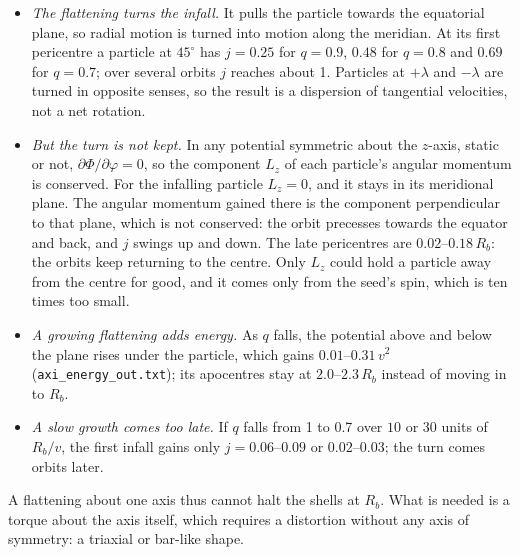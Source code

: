 \documentclass[11pt,a4paper]{article}
\begin{document}
\begin{itemize}
\item \emph{The flattening turns the infall.} It pulls the particle towards the
  equatorial plane, so radial motion is turned into motion along the meridian. At
  its first pericentre a particle at $45^\circ$ has $j=0.25$ for $q=0.9$, $0.48$ for
  $q=0.8$ and $0.69$ for $q=0.7$; over several orbits $j$ reaches about 1. Particles
  at $+\lambda$ and $-\lambda$ are turned in opposite senses, so the result is a
  dispersion of tangential velocities, not a net rotation.
\item \emph{But the turn is not kept.} In any potential symmetric about the
  $z$-axis, static or not, $\partial\Phi/\partial\varphi=0$, so the component $L_z$
  of each particle's angular momentum is conserved. For the infalling particle
  $L_z=0$, and it stays in its meridional plane. The angular momentum gained there is
  the component perpendicular to that plane, which is not conserved: the orbit
  precesses towards the equator and back, and $j$ swings up and down. The late
  pericentres are $0.02$--$0.18\,R_b$: the orbits keep returning to the centre. Only
  $L_z$ could hold a particle away from the centre for good, and it comes only from
  the seed's spin, which is ten times too small.
\item \emph{A growing flattening adds energy.} As $q$ falls, the potential above and
  below the plane rises under the particle, which gains $0.01$--$0.31\,v^2$
  (\texttt{axi\_energy\_out.txt}); its apocentres stay at $2.0$--$2.3\,R_b$ instead
  of moving in to $R_b$.
\item \emph{A slow growth comes too late.} If $q$ falls from 1 to 0.7 over $10$ or
  $30$ units of $R_b/v$, the first infall gains only $j=0.06$--$0.09$ or
  $0.02$--$0.03$; the turn comes orbits later.
\end{itemize}
A flattening about one axis thus cannot halt the shells at $R_b$. What is needed is a
torque about the axis itself, which requires a distortion without any axis of
symmetry: a triaxial or bar-like shape.
\end{document}
